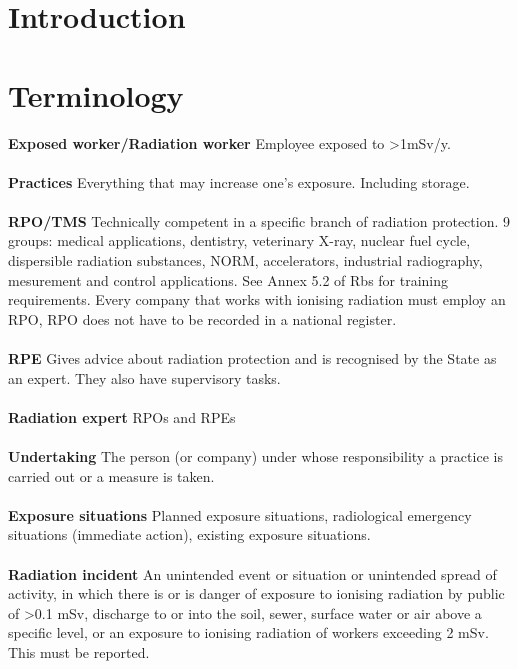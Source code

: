 \section{Introduction}
\section{Terminology}
\textbf{Exposed worker/Radiation worker} Employee exposed to >1mSv/y. \\\\
\textbf{Practices} Everything that may increase one's exposure. Including storage.\\\\
\textbf{RPO/TMS} Technically competent in a specific branch of radiation protection. 9 groups: medical applications, dentistry, veterinary X-ray, nuclear fuel cycle, dispersible radiation substances, NORM, accelerators, industrial radiography, mesurement and control applications. See Annex 5.2 of Rbs for training requirements. Every company that works with ionising radiation must employ an RPO, RPO does not have to be recorded in a national register.\\\\
\textbf{RPE} Gives advice about radiation protection and is recognised by the State as an expert. They also have supervisory tasks.\\\\
\textbf{Radiation expert} RPOs and RPEs \\\\
\textbf{Undertaking} The person (or company) under whose responsibility a practice is carried out or a measure is taken.\\\\
\textbf{Exposure situations} Planned exposure situations, radiological emergency situations (immediate action), existing exposure situations.\\\\
\textbf{Radiation incident} An unintended event or situation or unintended spread of activity, in which there is or is danger of exposure to ionising radiation by public of >0.1 mSv, discharge to or into the soil, sewer, surface water or air above a specific level, or an exposure to ionising radiation of workers exceeding 2 mSv. This must be reported.\\\\

